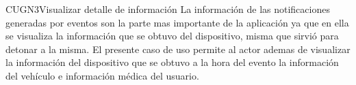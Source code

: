 
\begin{UseCase}{CUGN3}{Visualizar detalle de información}
    {
	  	La información de las notificaciones generadas por eventos son la parte mas importante de la aplicación ya que en ella se visualiza la información que se obtuvo del dispositivo, misma que sirvió para detonar a la misma. El presente caso de uso permite al actor ademas de visualizar la información del dispositivo que se obtuvo a la hora del evento la información del vehículo e información médica del usuario.
    }

\end{UseCase}
